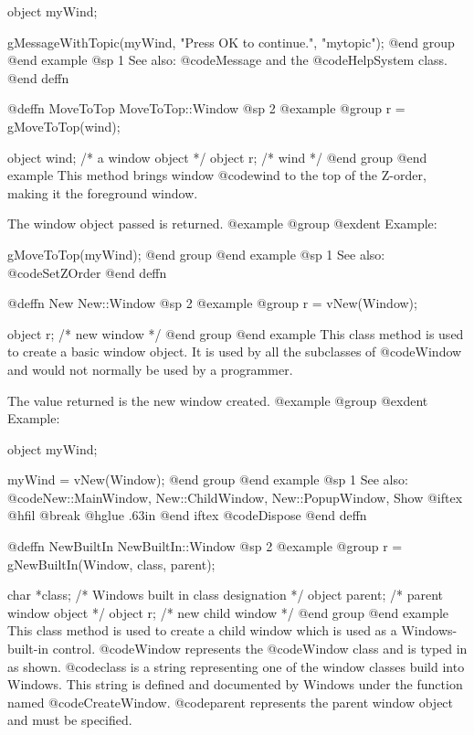 object  myWind;

gMessageWithTopic(myWind, "Press OK to continue.", "mytopic");
@end group
@end example
@sp 1
See also:  @code{Message} and the @code{HelpSystem} class.
@end deffn











@deffn {MoveToTop} MoveToTop::Window
@sp 2
@example
@group
r = gMoveToTop(wind);

object  wind;   /*  a window object  */
object  r;      /*  wind             */
@end group
@end example
This method brings window @code{wind} to the top of the Z-order,
making it the foreground window.

The window object passed is returned.
@example
@group
@exdent Example:

gMoveToTop(myWind);
@end group
@end example
@sp 1
See also:  @code{SetZOrder}
@end deffn




@deffn {New} New::Window
@sp 2
@example
@group
r = vNew(Window);

object  r;      /*  new window  */
@end group
@end example
This class method is used to create a basic window object.  It is used
by all the subclasses of @code{Window} and would not normally be
used by a programmer.

The value returned is the new window created.
@example
@group
@exdent Example:

object  myWind;

myWind = vNew(Window);
@end group
@end example
@sp 1
See also:  @code{New::MainWindow, New::ChildWindow, New::PopupWindow, Show}
@iftex
@hfil @break @hglue .63in   
@end iftex
@code{Dispose}
@end deffn







@deffn {NewBuiltIn} NewBuiltIn::Window
@sp 2
@example
@group
r = gNewBuiltIn(Window, class, parent);

char    *class; /*  Windows built in class designation  */
object  parent; /*  parent window object                */
object  r;      /*  new child window                    */
@end group
@end example
This class method is used to create a child window which is used as a
Windows-built-in control.  @code{Window} represents the @code{Window}
class and is typed in as shown.  @code{class} is a string representing
one of the window classes build into Windows.  This string is defined
and documented by Windows under the function named @code{CreateWindow}.
@code{parent} represents the parent window object and must be specified.

